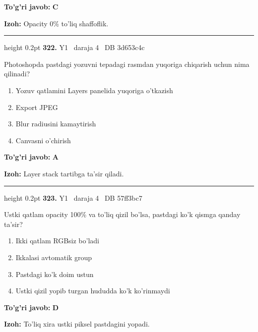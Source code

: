 \documentclass[10pt,a4paper,oneside]{article}
\begin{document}
\begin{tcolorbox}[enhanced,breakable,colback=teal!4,colframe=teal!45!black,boxrule=0.45pt,arc=1.2mm,left=2.8mm,right=2.8mm,top=2mm,bottom=2mm,before skip=2mm,after skip=2mm]
\textbf{\color{teal}To'g'ri javob:} \textbf{C}
\par\smallskip
\textbf{Izoh:} Opacity 0\% to'liq shaffoflik.
\end{tcolorbox}
\vspace{2mm}\hrule height 0.2pt \vspace{4mm}
\hypertarget{q322}{\textbf{\color{ink}322.}}  {\color{muted}\scriptsize Y1 \textbullet\ daraja 4 \textbullet\ DB 3d653c4c}
\par
Photoshopda pastdagi yozuvni tepadagi rasmdan yuqoriga chiqarish uchun nima qilinadi?
\begin{enumerate}[label=\Alph*),leftmargin=9mm]
\item Yozuv qatlamini Layers panelida yuqoriga o'tkazish
\item Export JPEG
\item Blur radiusini kamaytirish
\item Canvasni o'chirish
\end{enumerate}
\begin{tcolorbox}[enhanced,breakable,colback=teal!4,colframe=teal!45!black,boxrule=0.45pt,arc=1.2mm,left=2.8mm,right=2.8mm,top=2mm,bottom=2mm,before skip=2mm,after skip=2mm]
\textbf{\color{teal}To'g'ri javob:} \textbf{A}
\par\smallskip
\textbf{Izoh:} Layer stack tartibga ta'sir qiladi.
\end{tcolorbox}
\vspace{2mm}\hrule height 0.2pt \vspace{4mm}
\hypertarget{q323}{\textbf{\color{ink}323.}}  {\color{muted}\scriptsize Y1 \textbullet\ daraja 4 \textbullet\ DB 57ff3bc7}
\par
Ustki qatlam opacity 100\% va to'liq qizil bo'lsa, pastdagi ko'k qismga qanday ta'sir?
\begin{enumerate}[label=\Alph*),leftmargin=9mm]
\item Ikki qatlam RGBsiz bo'ladi
\item Ikkalasi avtomatik group
\item Pastdagi ko'k doim ustun
\item Ustki qizil yopib turgan hududda ko'k ko'rinmaydi
\end{enumerate}
\begin{tcolorbox}[enhanced,breakable,colback=teal!4,colframe=teal!45!black,boxrule=0.45pt,arc=1.2mm,left=2.8mm,right=2.8mm,top=2mm,bottom=2mm,before skip=2mm,after skip=2mm]
\textbf{\color{teal}To'g'ri javob:} \textbf{D}
\par\smallskip
\textbf{Izoh:} To'liq xira ustki piksel pastdagini yopadi.
\end{tcolorbox}
\end{document}
